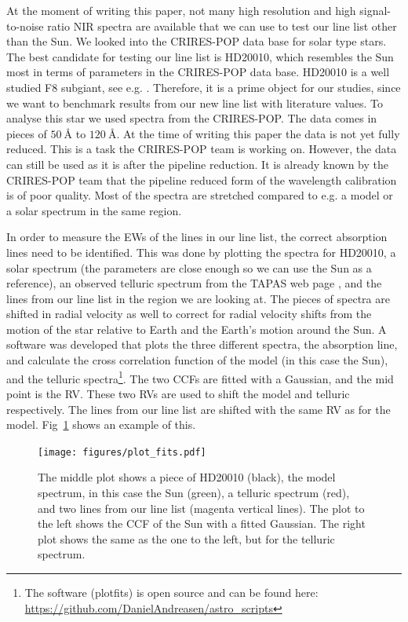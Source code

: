 \documentclass{aa}
\begin{document}
At the moment of writing this paper, not many high resolution and high
signal-to-noise ratio NIR spectra are available that we can use to test
our line list other than the Sun. We looked into the CRIRES-POP data
base \citep{Lebzelter2012} for solar type stars. The best candidate for
testing our line list is HD20010, which resembles the Sun most in terms
of parameters in the CRIRES-POP data base. HD20010 is a well studied
F8 subgiant, see e.g. \cite{Mortier2013,Lebzelter2012}. Therefore, it
is a prime object for our studies, since we want to benchmark results
from our new line list with literature values. To analyse this star
we used spectra from the CRIRES-POP. The data comes in pieces of
$\SI{50}{\angstrom}$ to $\SI{120}{\angstrom}$. At the time of writing
this paper the data is not yet fully reduced. This is a task the
CRIRES-POP team is working on. However, the data can still be used as it
is after the pipeline reduction. It is already known by the CRIRES-POP
team that the pipeline reduced form of the wavelength calibration is of
poor quality. Most of the spectra are stretched compared to e.g. a model
or a solar spectrum in the same region.

In order to measure the EWs of the lines in our line list, the
correct absorption lines need to be identified. This was done by
plotting the spectra for HD20010, a solar spectrum (the parameters
are close enough so we can use the Sun as a reference), an observed
telluric spectrum from the TAPAS web page \citep{Bertaux2014}, and
the lines from our line list in the region we are looking at. The
pieces of spectra are shifted in radial velocity as well to correct
for radial velocity shifts from the motion of the star relative
to Earth and the Earth's motion around the Sun. A software was
developed that plots the three different spectra, the absorption
line, and calculate the cross correlation function of the model (in
this case the Sun), and the telluric spectra\footnote{The software
(plot\textunderscore{}fits) is open source and can be found here:
\url{https://github.com/DanielAndreasen/astro_scripts}}. The two CCFs
are fitted with a Gaussian, and the mid point is the RV. These two
RVs are used to shift the model and telluric respectively. The lines
from our line list are shifted with the same RV as for the model.
Fig~\ref{fig:plot_fits} shows an example of this.

\begin{figure}[tbp!]
    \centering
    \texttt{[image: figures/plot\_fits.pdf]}
    \caption{The middle plot shows a piece of HD20010 (black), the model
    spectrum, in this case the Sun (green), a telluric spectrum (red), and two
    lines from our line list (magenta vertical lines). The plot to the left
    shows the CCF of the Sun with a fitted Gaussian. The right plot shows the
    same as the one to the left, but for the telluric spectrum.}
    \label{fig:plot_fits}
\end{figure}
\end{document}
